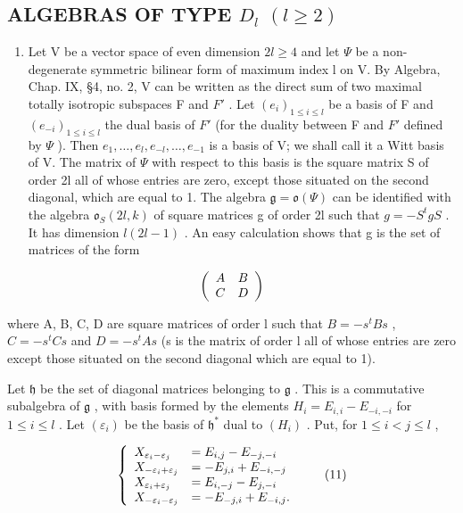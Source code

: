 \subsection{\texorpdfstring{ALGEBRAS OF TYPE \(D_{l}\) \((l\geq 2)\)}{ALGEBRAS OF TYPE D\_\{l\} (l\textbackslash geq 2)}}

\begin{enumerate}
\def\labelenumi{(\Roman{enumi})}
\tightlist
\item
  Let V be a vector space of even dimension \(2l \geq 4\) and let \(\varPsi\) be a non-degenerate symmetric bilinear form of maximum index l on V. By Algebra, Chap. IX, §4, no. 2, V can be written as the direct sum of two maximal totally isotropic subspaces F and \(F'\) . Let \((e_i)_{1 \leq i \leq l}\) be a basis of F and \((e_{-i})_{1 \leq i \leq l}\) the dual basis of \(F'\) (for the duality between F and \(F'\) defined by \(\varPsi\) ). Then \(e_1, \ldots, e_l, e_{-l}, \ldots, e_{-1}\) is a basis of V; we shall call it a Witt basis of V. The matrix of \(\varPsi\) with respect to this basis is the square matrix S of order 2l all of whose entries are zero, except those situated on the second diagonal, which are equal to 1. The algebra \(\mathfrak{g} = \mathfrak{o}(\varPsi)\) can be identified with the algebra \(\mathfrak{o}_S(2l, k)\) of square matrices g of order 2l such that \(g = -S^t g S\) . It has dimension \(l(2l - 1)\) . An easy calculation shows that g is the set of matrices of the form
\end{enumerate}

\[
\left( \begin{array}{c c} A & B \\ C & D \end{array} \right)
\]

where A, B, C, D are square matrices of order l such that \(B = -s^{t}Bs\) , \(C = -s^{t}Cs\) and \(D = -s^{t}As\) (s is the matrix of order l all of whose entries are zero except those situated on the second diagonal which are equal to 1).

Let \(\mathfrak{h}\) be the set of diagonal matrices belonging to \(\mathfrak{g}\) . This is a commutative subalgebra of \(\mathfrak{g}\) , with basis formed by the elements \(H_{i} = E_{i,i} - E_{-i,-i}\) for \(1 \leq i \leq l\) . Let \((\varepsilon_{i})\) be the basis of \(\mathfrak{h}^{*}\) dual to \((H_{i})\) . Put, for \(1 \leq i < j \leq l\) ,

\[
\left\{ \begin{array}{l l} X _ {\varepsilon_ {i} - \varepsilon_ {j}} & = E _ {i, j} - E _ {- j, - i} \\ X _ {- \varepsilon_ {i} + \varepsilon_ {j}} & = - E _ {j, i} + E _ {- i, - j} \\ X _ {\varepsilon_ {i} + \varepsilon_ {j}} & = E _ {i, - j} - E _ {j, - i} \\ X _ {- \varepsilon_ {i} - \varepsilon_ {j}} & = - E _ {- j, i} + E _ {- i, j}. \end{array} \right.\tag{11}
\]

